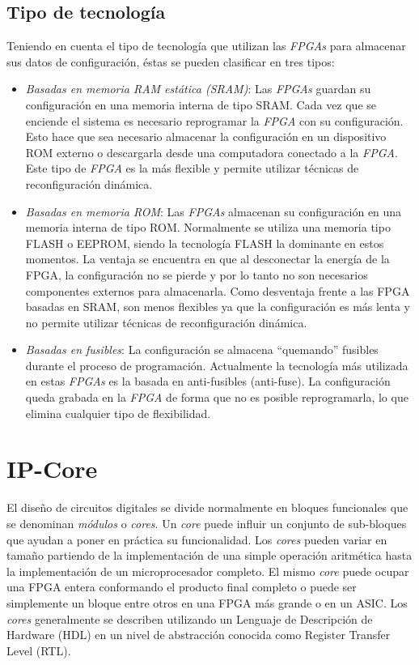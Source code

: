 \subsection{Tipo de tecnología} 

Teniendo en cuenta el tipo de tecnología que utilizan las
\textit{FPGAs} para almacenar sus datos de configuración, éstas se
pueden clasificar en tres tipos:

\begin{itemize}
\item \textit {Basadas en memoria RAM estática (SRAM)}: Las
  \textit{FPGAs} guardan su configuración en una memoria interna de
  tipo SRAM. Cada vez que se enciende el sistema es necesario
  reprogramar la \textit{FPGA} con su configuración. Esto hace que sea
  necesario almacenar la configuración en un dispositivo ROM externo o
  descargarla desde una computadora conectado a la \textit{FPGA}. Este tipo de
  \textit{FPGA} es la más flexible y permite utilizar técnicas de
  reconfiguración dinámica.
\item \textit{Basadas en memoria ROM}: Las \textit{FPGAs} almacenan su
  configuración en una memoria interna de tipo ROM. Normalmente se
  utiliza una memoria tipo FLASH o EEPROM, siendo la tecnología FLASH
  la dominante en estos momentos. La ventaja se encuentra en que al
  desconectar la energía de la FPGA, la configuración no se pierde y
  por lo tanto no son necesarios componentes externos para
  almacenarla. Como desventaja frente a las FPGA basadas en SRAM, son
  menos flexibles ya que la configuración es más lenta y no permite
  utilizar técnicas de reconfiguración dinámica.
\item \textit{Basadas en fusibles}: La configuración se almacena
  “quemando” fusibles durante el proceso de programación. Actualmente
  la tecnología más utilizada en estas \textit{FPGAs} es la basada en
  anti-fusibles (anti-fuse). La configuración queda grabada en la
  \textit{FPGA} de forma que no es posible reprogramarla, lo que
  elimina cualquier tipo de flexibilidad.
\end{itemize}


\section{IP-Core}
El diseño de circuitos digitales se divide normalmente en bloques
funcionales que se denominan \textit{módulos} o \textit{cores}. Un
\textit{core} puede influir un conjunto de sub-bloques que ayudan a
poner en práctica su funcionalidad. Los \textit{cores} pueden variar
en tamaño partiendo de la implementación de una simple operación
aritmética hasta la implementación de un microprocesador completo. El
mismo \textit{core} puede ocupar una FPGA entera conformando el
producto final completo o puede ser simplemente un bloque entre otros
en una FPGA más grande o en un ASIC. Los \textit{cores} generalmente se describen utilizando un Lenguaje de Descripción de Hardware (HDL)
en un nivel de abstracción conocida como Register Transfer Level
(RTL).
	
